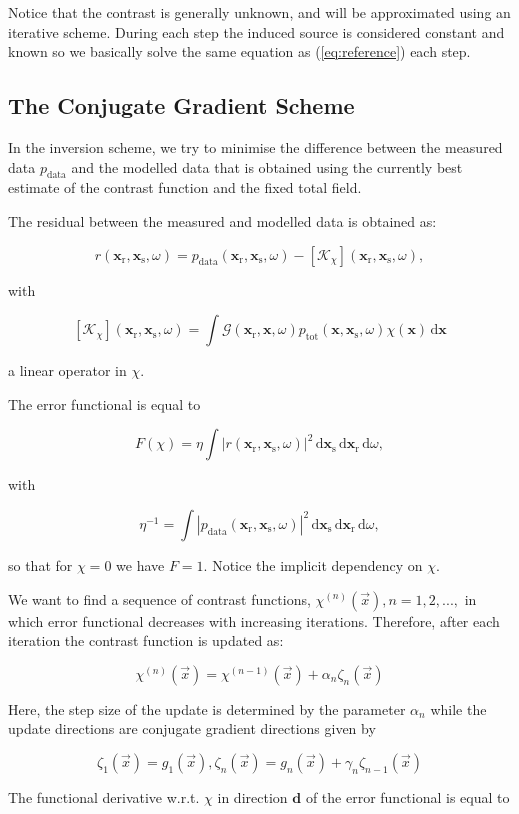 \documentclass[10pt,a4paper]{article}
\newcommand{\df}[1]{\, \ensuremath{\mbox{d}#1}}
\newcommand{\xs}{\mathbf{x}_\text{s}}
\newcommand{\xr}{\mathbf{x}_\text{r}}
\newcommand{\x}{\mathbf{x}}
\begin{document}
Notice that the contrast is generally unknown, and will be approximated using an iterative scheme. During each step the induced source is considered constant and known so we basically solve the same equation as (\ref{eq:reference}) each step.

\subsection{The Conjugate Gradient Scheme}

In the inversion scheme, we try to minimise the difference between the measured data $p_\text{data}$ and the modelled data that is obtained using the currently best estimate of the contrast function and the fixed total field. 

The residual between the measured and modelled data is obtained as: 

\[ r(\xr, \xs, \omega) = p_{\text{data}}(\xr, \xs, \omega) - \left[\mathcal{K}_\chi \right](\xr, \xs, \omega), \]

with

\[ \left[\mathcal{K}_\chi \right](\xr, \xs, \omega) = \int \mathcal{G}(\xr, \x, \omega) p_\text{tot}(\x, \xs, \omega) \chi(\x) \df{\x} \]

a linear operator in $\chi$. 

The error functional is equal to

\[ F(\chi) = \eta \int |r(\xr, \xs, \omega)|^2 \df{\mathbf{x}_\text{s}} \df{\xr} \df{\omega}, \]

with

\[ \eta^{-1} = \int | p_\text{data}(\xr, \xs, \omega) |^2 \df{\xs} \df{\xr} \df{\omega}, \]

so that for $\chi = 0$ we have $F = 1$. Notice the implicit dependency on $\chi$.

We want to find a sequence of contrast functions, $\chi^{(n)}(\vec{x}), n = 1,2,...,$ in which error functional decreases with increasing iterations. Therefore, after each iteration the contrast function is updated as: 

\[ \chi^{(n)}(\vec{x}) =  \chi^{(n-1)}(\vec{x}) + \alpha_n\zeta_n(\vec{x}) \]

Here, the step size of the update is determined by the parameter $\alpha_n$ while the update directions are conjugate gradient directions given by

\[\zeta_1(\vec{x}) = g_1(\vec{x}) ,\zeta_n(\vec{x}) = g_n(\vec{x}) + \gamma_n\zeta_{n-1}(\vec{x}) \]

The functional derivative w.r.t. $\chi$ in direction $\mathbf{d}$ of the error functional is equal to
\end{document}
